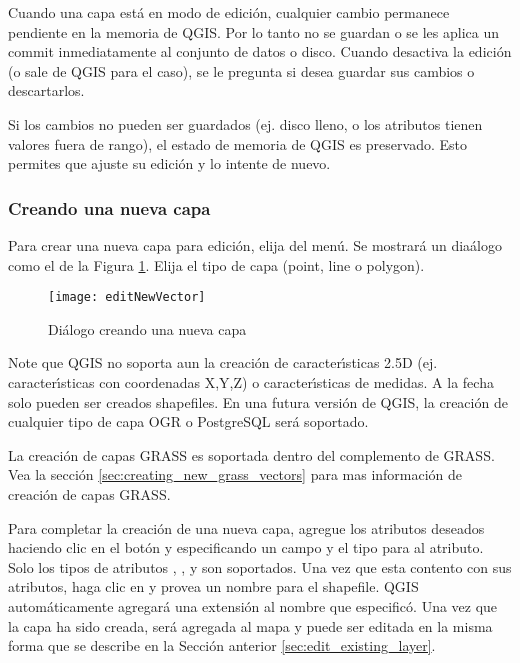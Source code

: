 Cuando una capa est\'a en modo de edici\'on, cualquier cambio permanece pendiente en la memoria de QGIS.
Por lo tanto no se guardan o se les aplica un commit inmediatamente al conjunto de datos o disco.
Cuando desactiva la edici\'on (o sale de QGIS para el caso), 
se le pregunta si desea guardar sus cambios o
descartarlos.

Si los cambios no pueden ser guardados (ej. disco lleno, o los atributos tienen
valores fuera de rango), el estado de memoria de QGIS es preservado.  Esto
permites que ajuste su edici\'on y lo intente de nuevo.

\subsubsection{Creando una nueva capa}\label{sec:create shape}

Para crear una nueva capa para edici\'on, elija  del
 men\'u. 
Se mostrar\'a un dia\'alogo  como el de la
Figura \ref{fig:newvectorlayer}. Elija el tipo de capa (point,
line o polygon).

\begin{figure}[ht]
   \begin{center}
   \caption{Di\'alogo creando una nueva capa \nixcaption}\label{fig:newvectorlayer}\smallskip
   \texttt{[image: editNewVector]}
\end{center} 
\end{figure}

Note que QGIS no soporta aun la creaci\'on de
caracter\'{\i}sticas 2.5D (ej. caracter\'{\i}sticas con coordenadas X,Y,Z) o caracter\'{\i}sticas de medidas.
A la fecha solo pueden ser creados shapefiles. En una futura versi\'on de QGIS, la creaci\'on de cualquier tipo
de capa OGR o PostgreSQL ser\'a soportado. 

La creaci\'on de capas GRASS es soportada dentro del complemento de GRASS. Vea la secci\'on 
\ref{sec:creating_new_grass_vectors} para mas informaci\'on de creaci\'on de capas GRASS.

Para completar la creaci\'on de una nueva capa, agregue los atributos deseados haciendo
clic en el bot\'on   y especificando un campo y el tipo para al atributo.
Solo los tipos de atributos , , y  son soportados. Una vez que esta contento con sus atributos,
haga clic en  y provea un nombre para el shapefile.
QGIS autom\'aticamente agregar\'a una extensi\'on  al nombre que especific\'o. Una vez
que la capa ha sido creada, ser\'a agregada al mapa y puede ser editada en la misma forma
que se describe en la Secci\'on anterior \ref{sec:edit_existing_layer}. 

